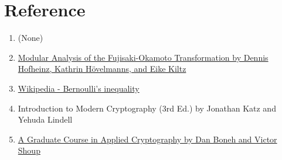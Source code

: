 


\clearpage
{}


\clearpage
{}


\clearpage
{}


\clearpage
{}







\clearpage
\section*{Reference}
\begin{enumerate}
    \item[P1] (None)
    \item[P2] \href{https://eprint.iacr.org/2017/604.pdf}{Modular Analysis of the Fujisaki-Okamoto Transformation by Dennis Hofheinz, Kathrin Hövelmanns, and Eike Kiltz}
    \item[P3] \href{https://en.wikipedia.org/wiki/Bernoulli%27s_inequality}{Wikipedia - Bernoulli's inequality}
    \item[P4] Introduction to Modern Cryptography (3rd Ed.) by Jonathan Katz and Yehuda Lindell
    \item[P5] \href{http://toc.cryptobook.us/}{A Graduate Course in Applied Cryptography by Dan Boneh and Victor Shoup}
\end{enumerate}